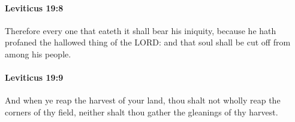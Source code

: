 		\paragraph{Leviticus 19:8} %
			\label{LEVITICUS-19-8}

			Therefore every one that eateth it shall bear his iniquity, because he hath profaned the hallowed thing of the LORD: and that soul shall be cut off from among his people.


		\paragraph{Leviticus 19:9} %
			\label{LEVITICUS-19-9}

			And when ye reap the harvest of your land, thou shalt not wholly reap the corners of thy field, neither shalt thou gather the gleanings of thy harvest.


